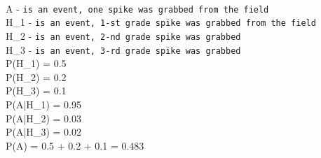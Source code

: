 \documentclass[11pt]{article}
\begin{document}
\\ A - \texttt{is an event, one spike was grabbed from the field}
\\ H_{1} - \texttt{is an event, 1-st grade spike was grabbed from the field}
\\ H_{2} - \texttt{is an event, 2-nd grade spike was grabbed}
\\ H_{3} - \texttt{is an event, 3-rd grade spike was grabbed}
\\ P(H_{1}) = 0.5
\\ P(H_{2}) = 0.2
\\ P(H_{3}) = 0.1
\\ P(A|H_{1}) = 0.95
\\ P(A|H_{2}) = 0.03
\\ P(A|H_{3}) = 0.02
\\ P(A) = 0.5 + 0.2  + 0.1  = 0.483
\end{document}
